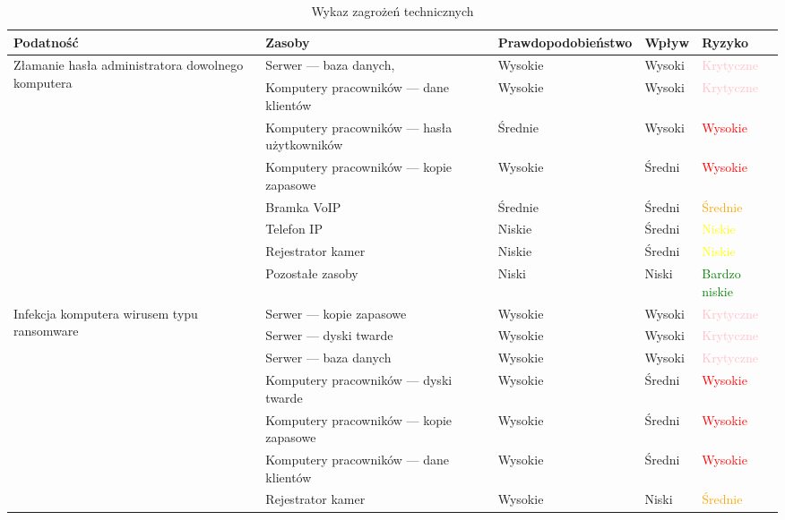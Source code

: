 \begin{landscape}
\begin{longtable}[!ht]{|m{4cm}|m{6cm}|m{4.5cm}|m{3cm}|m{3cm}|}
	\caption{Wykaz zagrożeń technicznych}
	\label{tab:zagrozenia_techniczne}\\
	\hline	
	\textbf{Podatność} & \textbf{Zasoby} & \textbf{Prawdopodobieństwo} & \textbf{Wpływ} &  \textbf{Ryzyko} \\ \hline
	\multirow{5}{4cm}{Złamanie hasła administratora dowolnego komputera}  
		&   Serwer --- baza danych,  & Wysokie & Wysoki & \textcolor{pink}{Krytyczne}  \\ \cline{2-5}
		& Komputery pracowników --- dane klientów & Wysokie & Wysoki & \textcolor{pink}{Krytyczne} \\ \cline{2-5}
		& Komputery pracowników --- hasła użytkowników & Średnie & Wysoki & \textcolor{red}{Wysokie} \\ \cline{2-5}
		& Komputery pracowników --- kopie zapasowe & Wysokie & Średni & \textcolor{red}{Wysokie} \\ \cline{2-5}
		& Bramka VoIP & Średnie & Średni & \textcolor{orange}{Średnie} \\ \cline{2-5}
		& Telefon IP & Niskie & Średni & \textcolor{yellow}{Niskie} \\ \cline{2-5}
		& Rejestrator kamer & Niskie & Średni & \textcolor{yellow}{Niskie} \\ \cline{2-5}
		& Pozostałe zasoby & Niski & Niski & \textcolor{green}{Bardzo niskie} \\ \cline{2-5}
	\hline
	\multirow{8}{4cm}{Infekcja komputera wirusem typu ransomware}
		& Serwer --- kopie zapasowe & Wysokie & Wysoki & \textcolor{pink}{Krytyczne} \\ \cline{2-5}
		& Serwer --- dyski twarde & Wysokie & Wysoki & \textcolor{pink}{Krytyczne} \\ \cline{2-5}
		& Serwer --- baza danych & Wysokie & Wysoki & \textcolor{pink}{Krytyczne} \\ \cline{2-5}
		& Komputery pracowników --- dyski twarde & Wysokie & Średni & \textcolor{red}{Wysokie} \\ \cline{2-5}
		& Komputery pracowników --- kopie zapasowe & Wysokie & Średni & \textcolor{red}{Wysokie} \\ \cline{2-5}
		& Komputery pracowników --- dane klientów & Wysokie & Średni & \textcolor{red}{Wysokie} \\ \cline{2-5}
		& Rejestrator kamer & Wysokie & Niski & \textcolor{orange}{Średnie} \\ \cline{2-5}

\end{longtable}
\end{landscape}
